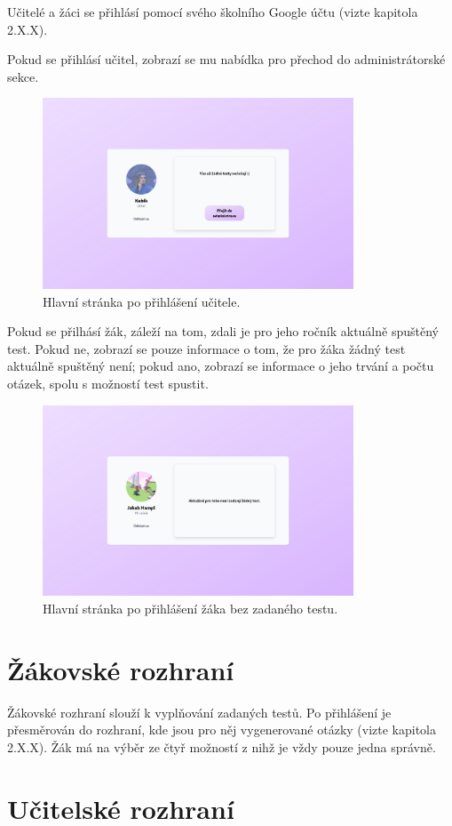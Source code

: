 Učitelé a žáci se přihlásí pomocí svého školního Google účtu (vizte kapitola 2.X.X).

\newpage

Pokud se přihlásí učitel, zobrazí se mu nabídka pro přechod do administrátorské sekce.

\begin{figure}[H]
    \centering
    \includegraphics[width=350px]{images/01design/teacher.png}
    \caption{Hlavní stránka po přihlášení učitele.}
\end{figure}

Pokud se přilhásí žák, záleží na tom, zdali je pro jeho ročník aktuálně spuštěný test. Pokud ne, zobrazí se pouze informace o tom, že pro žáka žádný test aktuálně spuštěný není; pokud ano, zobrazí se informace o jeho trvání a počtu otázek, spolu s možností test spustit.

\begin{figure}[H]
    \centering
    \includegraphics[width=350px]{images/01design/student-no-test.png}
    \caption{Hlavní stránka po přihlášení žáka bez zadaného testu.}
\end{figure}

\section{Žákovské rozhraní}

Žákovské rozhraní slouží k vyplňování zadaných testů. Po přihlášení je přesměrován do rozhraní, kde jsou pro něj vygenerované otázky (vizte kapitola 2.X.X). Žák má na výběr ze čtyř možností z nihž je vždy pouze jedna správně.

\section{Učitelské rozhraní}